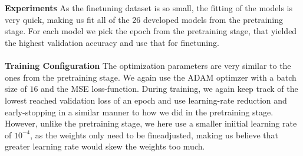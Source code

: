 \documentclass[./main.tex]{subfiles}
\begin{document}
\\
\\
\textbf{Experiments} As the finetuning dataset is so small, the fitting of the models is very quick, making us fit all of the 26 developed models from the pretraining stage. For each model we pick the epoch from the pretraining stage, that yielded the highest validation accuracy and use that for finetuning.
\\
\\
\textbf{Training Configuration} The optimization parameters are very similar to the ones from the pretraining stage. We again use the ADAM optimzer with a batch size of $16$ and the MSE loss-function. During training, we again keep track of the lowest reached validation loss of an epoch and use learning-rate reduction and early-stopping in a similar manner to how we did in the pretraining stage. However, unlike the pretraining stage, we here use a smaller iniitial learning rate of $10^{-4}$, as the weights only need to be fineadjusted, making us believe that greater learning rate would skew the weights too much.
\end{document}
